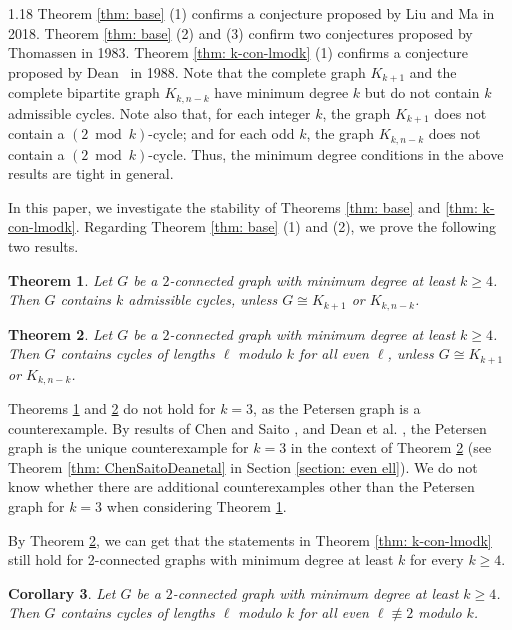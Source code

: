 \documentclass[10pt]{article}
\newtheorem{theorem}{Theorem}[section]
\newtheorem{corollary}[theorem]{Corollary}
\begin{document}
\begin{spacing}{1.18}
   Theorem \ref{thm: base} (1) confirms a conjecture proposed by Liu and Ma \cite{LM18} in 2018. Theorem \ref{thm: base} (2) and (3) confirm two conjectures proposed by Thomassen \cite{T83} in 1983. Theorem \ref{thm: k-con-lmodk} (1) confirms a conjecture proposed by Dean~\cite{D88} in 1988. Note that the complete graph $K_{k+1}$ and the complete bipartite graph $K_{k,n-k}$ have minimum degree $k$ but do not contain $k$ admissible cycles. Note also that, for each integer $k$, the graph $K_{k+1}$ does not contain a $(2\bmod k)$-cycle; and for each odd $k$, the graph $K_{k,n-k}$ does not contain a $(2\bmod k)$-cycle. Thus, the minimum degree conditions in the above results are tight in general. 

   In this paper, we investigate the stability of Theorems \ref{thm: base} and \ref{thm: k-con-lmodk}. Regarding Theorem \ref{thm: base} (1) and (2), we prove the following two results.


\begin{theorem}\label{thm: k adm cycles min degree k}
    Let $G$ be a $2$-connected graph with minimum degree at least $k\geqslant 4$. Then $G$ contains $k$ admissible cycles, unless $G\cong K_{k+1}$ or $K_{k,n-k}$.
\end{theorem}


\begin{theorem}\label{thm: l mod k min degree k}
    Let $G$ be a $2$-connected graph with minimum degree at least $k\geqslant 4$. Then $G$ contains cycles of lengths $\ell$ modulo $k$ for all even $\ell$, unless $G\cong K_{k+1}$ or $K_{k,n-k}$.
\end{theorem}

    Theorems \ref{thm: k adm cycles min degree k} and \ref{thm: l mod k min degree k} do not hold for $k=3$, as the Petersen graph is a counterexample. By results of Chen and Saito \cite{CS94}, and Dean et al. \cite{D+91}, the Petersen graph is the unique counterexample for $k=3$ in the context of Theorem \ref{thm: l mod k min degree k} (see Theorem \ref{thm: ChenSaitoDeanetal} in Section \ref{section: even ell}). We do not know whether there are additional counterexamples other than the Petersen graph for $k=3$ when considering Theorem \ref{thm: k adm cycles min degree k}. 

    By Theorem \ref{thm: l mod k min degree k}, we can get that the statements in Theorem \ref{thm: k-con-lmodk} still hold for 2-connected graphs with minimum degree at least $k$ for every $k\geqslant 4$.

\begin{corollary}\label{corollary: l mod k}
    Let $G$ be a $2$-connected graph with minimum degree at least $k\geqslant 4$. Then $G$ contains cycles of lengths $\ell$ modulo $k$ for all even $\ell\not\equiv 2$ modulo $k$.
\end{corollary}


\end{spacing}
\end{document}
